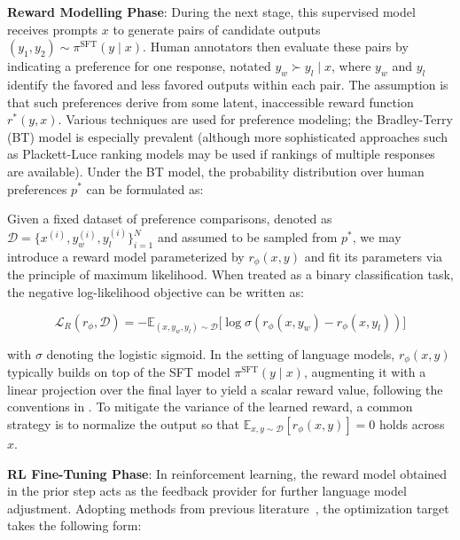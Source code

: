 \textbf{Reward Modelling Phase}: During the next stage, this supervised model receives prompts $x$ to generate pairs of candidate outputs $(y_1, y_2)\sim \pi^\text{SFT}(y \mid x)$. Human annotators then evaluate these pairs by indicating a preference for one response, notated $y_w\succ y_l \mid x$, where $y_w$ and $y_l$ identify the favored and less favored outputs within each pair. The assumption is that such preferences derive from some latent, inaccessible reward function $r^*(y, x)$. Various techniques are used for preference modeling; the Bradley-Terry (BT) model \cite{bradley1952rankanalysis} is especially prevalent (although more sophisticated approaches such as Plackett-Luce ranking models \citep{plackett1975analysis, luce2012individual} may be used if rankings of multiple responses are available). Under the BT model, the probability distribution over human preferences $p^*$ can be formulated as:

Given a fixed dataset of preference comparisons, denoted as $\mathcal{D}=\bigl\{x^{(i)}, y_w^{(i)}, y_l^{(i)}\bigr\}_{i=1}^N$ and assumed to be sampled from $p^*$, we may introduce a reward model parameterized by $r_{\phi}(x, y)$ and fit its parameters via the principle of maximum likelihood. When treated as a binary classification task, the negative log-likelihood objective can be written as:

\begin{equation}\label{eq:reward_model}
    \mathcal{L}_R(r_{\phi}, \mathcal{D}) = -\mathbb{E}_{(x, y_w, y_l)\sim \mathcal{D}}\bigl[\log \sigma(r_{\phi}(x, y_w)- r_{\phi}(x, y_l))\bigr]
\end{equation}

with $\sigma$ denoting the logistic sigmoid. In the setting of language models, $r_{\phi}(x, y)$ typically builds on top of the SFT model $\pi^\text{SFT}(y \mid x)$, augmenting it with a linear projection over the final layer to yield a scalar reward value, following the conventions in \cite{ziegler2020finetuning}. To mitigate the variance of the learned reward, a common strategy is to normalize the output so that $\mathbb{E}_{x,y\sim \mathcal{D}}\left[r_\phi(x, y)\right] = 0$ holds across $x$.

\textbf{RL Fine-Tuning Phase}: In reinforcement learning, the reward model obtained in the prior step acts as the feedback provider for further language model adjustment. Adopting methods from previous literature~\citep{jaques2017sequence, jaques2020human}, the optimization target takes the following form:

